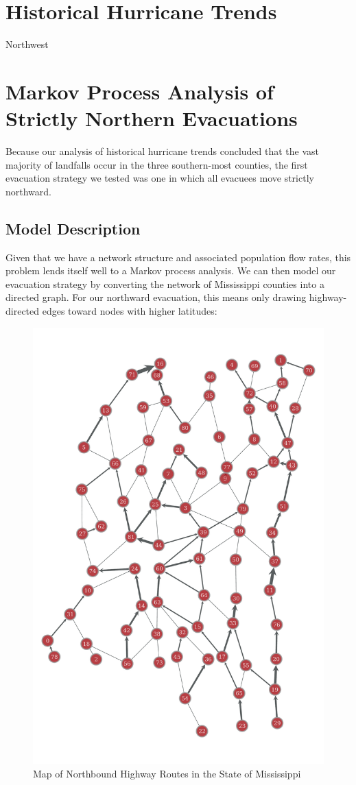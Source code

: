 \documentclass[titlepage]{article}
\begin{document}
\section{Historical Hurricane Trends}
\label{sec:hurricanes}
  \par
    Northwest


\section{Markov Process Analysis of Strictly Northern Evacuations}
\label{sec:markov}
  Because our analysis of historical hurricane trends concluded that the vast majority of landfalls occur in the three southern-most counties, the first evacuation strategy we tested was one in which all evacuees move strictly northward.
  \subsection{Model Description}
    Given that we have a network structure and associated population flow rates, this problem lends itself well to a Markov process analysis. We can then model our evacuation strategy by converting the network of Mississippi counties into a directed graph. For our northward evacuation, this means only drawing highway-directed edges toward nodes with higher latitudes:
    \begin{figure}[H]
      \centering
      \includegraphics[width=.5\textwidth]{figures/full_directed_NS.pdf}
      \caption{Map of Northbound Highway Routes in the State of Mississippi \cite{ms_highways}}
    \end{figure}
\end{document}
